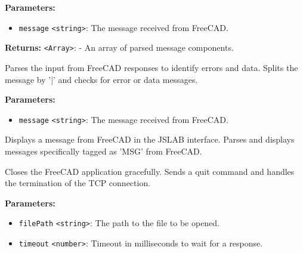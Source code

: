 \documentclass[12pt,a4paper]{article}
\begin{document}
\vspace{5mm}
\noindent {}


\noindent \textbf{Parameters:}
\begin{itemize}
  \item \texttt{message} \texttt{<string>}: The message received from FreeCAD.
\end{itemize}

\noindent \textbf{Returns:} \texttt{<Array>}: - An array of parsed message components.

\noindent Parses the input from FreeCAD responses to identify errors and data.
Splits the message by '|' and checks for error or data messages.

\vspace{5mm}
\noindent {}


\noindent \textbf{Parameters:}
\begin{itemize}
  \item \texttt{message} \texttt{<string>}: The message received from FreeCAD.
\end{itemize}

\noindent Displays a message from FreeCAD in the JSLAB interface.
Parses and displays messages specifically tagged as 'MSG' from FreeCAD.

\vspace{5mm}
\noindent {}


\noindent Closes the FreeCAD application gracefully.
Sends a quit command and handles the termination of the TCP connection.

\vspace{5mm}
\noindent {}


\noindent \textbf{Parameters:}
\begin{itemize}
  \item \texttt{filePath} \texttt{<string>}: The path to the file to be opened.
  \item \texttt{timeout} \texttt{<number>}: Timeout in milliseconds to wait for a response.
\end{itemize}
\end{document}
